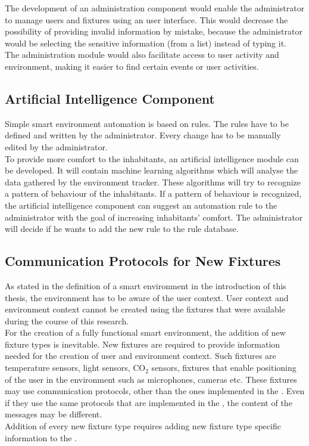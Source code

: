 	The development of an administration component would enable the administrator to manage users and fixtures using an user interface. This would decrease the possibility of providing invalid information by mistake, because the administrator would be selecting the sensitive information (from a list) instead of typing it. \\
	The administration module would also facilitate access to user activity and environment, making it easier to find certain events or user activities.
	

\subsection{Artificial Intelligence Component}
Simple smart environment automation is based on rules. The rules have to be defined and written by the administrator. Every change has to be manually edited by the administrator. \\ 

To provide more comfort to the inhabitants, an artificial intelligence module can be developed. It will contain machine learning algorithms which will analyse the data gathered by the environment tracker. 
These algorithms will try to recognize a pattern of behaviour of the inhabitants. If a pattern of behaviour is recognized, the artificial intelligence component can suggest an automation rule to the administrator with the goal of increasing inhabitants' comfort. The administrator will decide if he wants to add the new rule to the rule database.


\subsection{Communication Protocols for New Fixtures}
As stated in the definition of a smart environment in the introduction of this thesis, the environment has to be aware of the user context. User context and environment context cannot be created using the fixtures that were available during the course of this research.	\\ 

For the creation of a fully functional smart environment, the addition of new fixture types is inevitable. New fixtures are required to provide information needed for the creation of user and environment context. Such fixtures are temperature sensors, light sensors, CO$_{2}$ sensors, fixtures that enable positioning of the user in the environment such as microphones, cameras etc. These fixtures may use communication protocols, other than the ones implemented in the \seif. Even if they use the same protocols that are implemented in the \seif, the content of the messages may be different. \\
Addition of every new fixture type requires adding new fixture type specific information to the \seif. 



